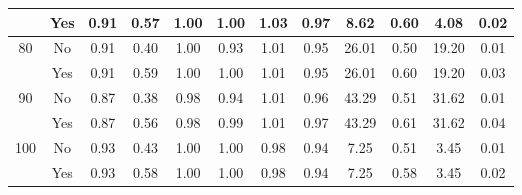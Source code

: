 \begin{tabular}{cccccccccccc}
 & Yes & 0.91 & 0.57 & 1.00 & 1.00 & 1.03 & 0.97 & 8.62 & 0.60 & 4.08 & 0.02 \\
\midrule
\multirow{2}{*}{80} & No & 0.91 & 0.40 & 1.00 & 0.93 & 1.01 & 0.95 & 26.01 & 0.50 & 19.20 & 0.01 \\
 & Yes & 0.91 & 0.59 & 1.00 & 1.00 & 1.01 & 0.95 & 26.01 & 0.60 & 19.20 & 0.03 \\
\midrule
\multirow{2}{*}{90} & No & 0.87 & 0.38 & 0.98 & 0.94 & 1.01 & 0.96 & 43.29 & 0.51 & 31.62 & 0.01 \\
 & Yes & 0.87 & 0.56 & 0.98 & 0.99 & 1.01 & 0.97 & 43.29 & 0.61 & 31.62 & 0.04 \\
\midrule
\multirow{2}{*}{100} & No & 0.93 & 0.43 & 1.00 & 1.00 & 0.98 & 0.94 & 7.25 & 0.51 & 3.45 & 0.01 \\
 & Yes & 0.93 & 0.58 & 1.00 & 1.00 & 0.98 & 0.94 & 7.25 & 0.58 & 3.45 & 0.02 \\
\bottomrule
\end{tabular}
